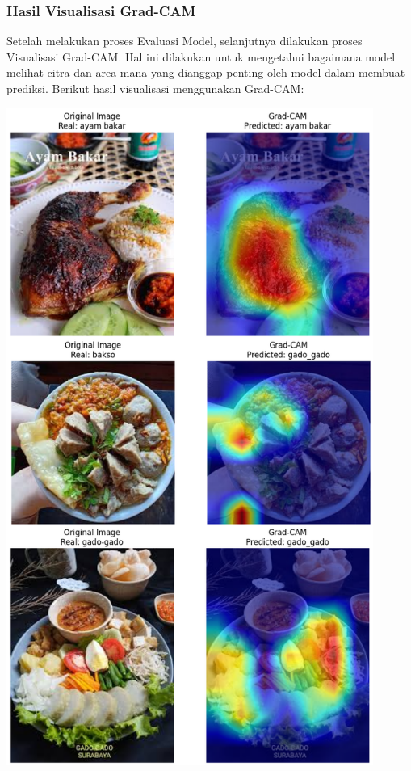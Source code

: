 \subsubsection{Hasil Visualisasi Grad-CAM}
Setelah melakukan proses Evaluasi Model, selanjutnya dilakukan proses Visualisasi Grad-CAM. Hal ini dilakukan untuk mengetahui bagaimana model melihat citra dan area mana yang dianggap penting oleh model dalam membuat prediksi. Berikut hasil visualisasi menggunakan Grad-CAM:

\begin{afigure}
    \includegraphics[height=0.75\textheight, width=0.9\textwidth, center]{images/grad-cam-1.png}
    \label{fig:grad-cam-1}
\end{afigure}
